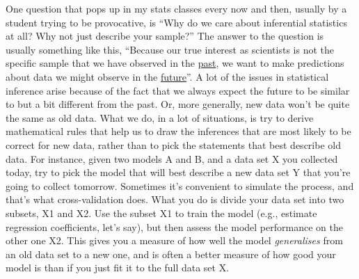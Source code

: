\begin{itemize}
 One question that pops up in my stats classes every now and then, usually by a student trying to be provocative, is ``Why do we care about inferential statistics at all? Why not just describe your sample?'' The answer to the question is usually something like this, ``Because our true interest as scientists is not the specific sample that we have observed in the \underline{past}, we want to make predictions about data we might observe in the \underline{future}''. A lot of the issues in statistical inference arise because of the fact that we always expect the future to be similar to but a bit different from the past. Or, more generally, new data won't be quite the same as old data. What we do, in a lot of situations, is try to derive mathematical rules that help us to draw the inferences that are most likely to be correct for new data, rather than to pick the statements that best describe old data. For instance, given two models A and B, and a data set X you collected today, try to pick the model that will best describe a new data set Y that you're going to collect tomorrow. Sometimes it's convenient to simulate the process, and that's what cross-validation does. What you do is divide your data set into two subsets, X1 and X2. Use the subset X1 to train the model (e.g., estimate regression coefficients, let's say), but then assess the model performance on the other one X2. This gives you a measure of how well the model {\it generalises} from an old data set to a new one, and is often a better measure of how good your model is than if you just fit it to the full data set X.  


\end{itemize}
